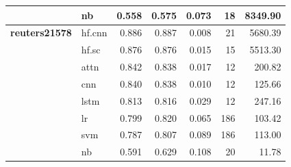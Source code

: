 \documentclass[final]{clv2025}
\begin{document}
\begin{table}[h!]
{\begin{tabular}{@{}p{2cm}p{1.2cm}rrrrr@{}}
 & nb & 0.558 & 0.575 & 0.073 & 18 & 8349.90 \\
\midrule
\textbf{reuters21578} & hf.cnn & 0.886 & 0.887 & 0.008 & 21 & 5680.39 \\
 & hf.sc & 0.876 & 0.876 & 0.015 & 15 & 5513.30 \\
 & attn & 0.842 & 0.838 & 0.017 & 12 & 200.82 \\
 & cnn & 0.840 & 0.838 & 0.010 & 12 & 125.66 \\
 & lstm & 0.813 & 0.816 & 0.029 & 12 & 247.16 \\
 & lr & 0.799 & 0.820 & 0.065 & 186 & 103.42 \\
 & svm & 0.787 & 0.807 & 0.089 & 186 & 113.00 \\
 & nb & 0.591 & 0.629 & 0.108 & 20 & 11.78 \\
\bottomrule
\end{tabular}%
}
\end{table}
\end{document}
